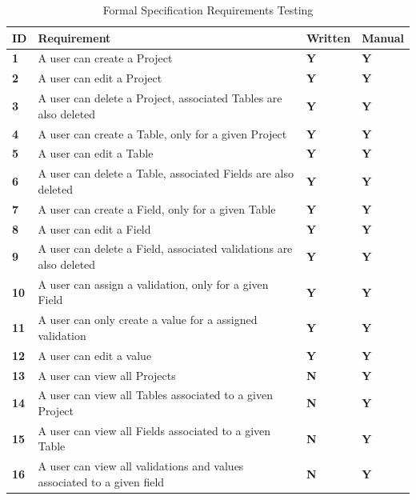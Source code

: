 \documentclass[a4paper,12pt]{article}
\begin{document}
\begin{table}
\centering
\caption{Formal Specification Requirements Testing}
\label{met:1}
\begin{tabularx}{\textwidth}{|l|X|l|l|}
\hline
\textbf{ID} & \textbf{Requirement}                                                   & \textbf{Written} & \textbf{Manual} \\ \hline
\textbf{1}  & A user can create a Project                                            & \textbf{Y} & \textbf{Y}       \\ \hline
\textbf{2}  & A user can edit a Project                                              & \textbf{Y}  & \textbf{Y}      \\ \hline
\textbf{3}  & A user can delete a Project, associated Tables are also deleted        & \textbf{Y}  & \textbf{Y}      \\ \hline
\textbf{4}  & A user can create a Table, only for a given  Project                   & \textbf{Y}  & \textbf{Y}      \\ \hline
\textbf{5}  & A user can edit a Table                                                & \textbf{Y}     & \textbf{Y}   \\ \hline
\textbf{6}  & A user can delete a Table, associated Fields are also deleted          & \textbf{Y} & \textbf{Y}       \\ \hline
\textbf{7}  & A user can create a Field, only for a given Table                      & \textbf{Y}   & \textbf{Y}     \\ \hline
\textbf{8}  & A user can edit a Field                                                & \textbf{Y}    & \textbf{Y}    \\ \hline
\textbf{9}  & A user can delete a Field, associated validations are also deleted     & \textbf{Y}      & \textbf{Y}  \\ \hline
\textbf{10} & A user can assign a validation, only for a given Field       & \textbf{Y}    & \textbf{Y}    \\ \hline
\textbf{11} & A user can only create a value for a assigned validation                  & \textbf{Y}      & \textbf{Y}  \\ \hline
\textbf{12} & A user can edit a  value                      & \textbf{Y}     & \textbf{Y}   \\ \hline
\textbf{13} & A user can view all Projects                 & \textbf{N}   & \textbf{Y}     \\ \hline
\textbf{14} & A user can view all Tables associated to a given Project               & \textbf{N}   & \textbf{Y}     \\ \hline
\textbf{15} & A user can view all Fields associated to a given Table                 & \textbf{N}   & \textbf{Y}     \\ \hline
\textbf{16} & A user can view all validations and values associated to a given field & \textbf{N}    & \textbf{Y}    \\ \hline
\end{tabularx}
\end{table}
\end{document}
